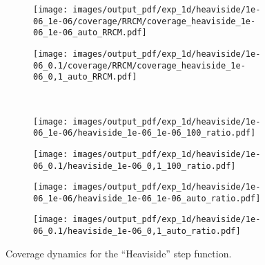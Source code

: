 \documentclass[a4paper,14pt]{extarticle}
\begin{document}
\begin{figure}
\begin{subfigure}[b]{0.25\linewidth}
  \end{subfigure}%
  \begin{subfigure}[b]{0.25\linewidth}
    \texttt{[image: images/output\_pdf/exp\_1d/heaviside/1e-06\_1e-06/coverage/RRCM/coverage\_heaviside\_1e-06\_1e-06\_auto\_RRCM.pdf]}
  \end{subfigure}%
  \begin{subfigure}[b]{0.25\linewidth}
    \texttt{[image: images/output\_pdf/exp\_1d/heaviside/1e-06\_0.1/coverage/RRCM/coverage\_heaviside\_1e-06\_0,1\_auto\_RRCM.pdf]}
  \end{subfigure}\\
  \begin{subfigure}[b]{0.25\linewidth}
    \texttt{[image: images/output\_pdf/exp\_1d/heaviside/1e-06\_1e-06/heaviside\_1e-06\_1e-06\_100\_ratio.pdf]}
    \caption{} \label{fig:heaviside_1d_low_noise_c1}
  \end{subfigure}%
  \begin{subfigure}[b]{0.25\linewidth}
    \texttt{[image: images/output\_pdf/exp\_1d/heaviside/1e-06\_0.1/heaviside\_1e-06\_0,1\_100\_ratio.pdf]}
    \caption{} \label{fig:heaviside_1d_low_noise_c2}
  \end{subfigure}%
  \begin{subfigure}[b]{0.25\linewidth}
    \texttt{[image: images/output\_pdf/exp\_1d/heaviside/1e-06\_1e-06/heaviside\_1e-06\_1e-06\_auto\_ratio.pdf]}
    \caption{} \label{fig:heaviside_1d_low_noise_c3}
  \end{subfigure}%
  \begin{subfigure}[b]{0.25\linewidth}
    \texttt{[image: images/output\_pdf/exp\_1d/heaviside/1e-06\_0.1/heaviside\_1e-06\_0,1\_auto\_ratio.pdf]}
    \caption{} \label{fig:heaviside_1d_low_noise_c4}
  \end{subfigure}%
  \caption{Coverage dynamics for the ``Heaviside'' step function.}
  \label{fig:heaviside_1d_low_noise}
\end{figure}
\end{document}
